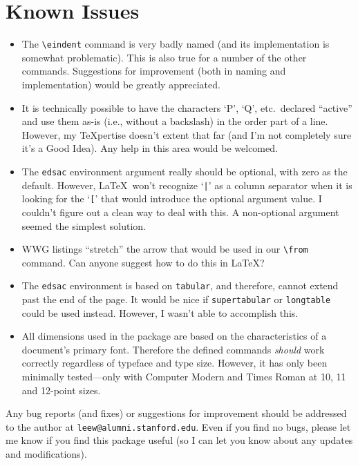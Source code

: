 \documentclass[11pt]{article}
\begin{document}
\section*{Known Issues}
\begin{itemize}
    \item
    The \verb"\eindent" command is very badly named (and its implementation is
    somewhat problematic).  This is also true for a number of the
    other commands.  Suggestions for improvement (both in naming and
    implementation) would be greatly appreciated.
    \item
    It is technically possible to have the characters `P', `Q', etc.\
    declared ``active'' and use them as-is (i.e., without a backslash)
    in the order part of a line.  However, my \TeX{pertise} doesn't
    extent that far (and I'm not completely sure it's a Good Idea).
    Any help in this area would be welcomed.
    \item
    The \texttt{edsac} environment argument really should be
    optional, with zero as the default.  However, \LaTeX\ won't
    recognize `\verb"|"' as a column separator when it is looking for
    the `\verb"["' that would introduce the optional argument value.
    I couldn't figure
    out a clean way to deal with this.  A non-optional argument seemed
    the simplest solution.
    \item
    WWG listings ``stretch'' the arrow that would be used in our
    \verb"\from" command.  Can anyone suggest how to do this in
    \LaTeX?
    \item
    The \texttt{edsac} environment is based on \texttt{tabular}, and
    therefore, cannot extend past the end of the page.  It would be
    nice if \texttt{supertabular} or \texttt{longtable} could be used
    instead.  However,  I wasn't able to accomplish this.
    \item
    All dimensions used in the package are based on the
    characteristics of a document's primary font. Therefore the
    defined commands \emph{should} work correctly regardless of
    typeface and type size.  However, it has only been minimally
    tested---only with Computer Modern and Times Roman at 10, 11 and
    12-point sizes.
\end{itemize}

Any bug reports (and fixes) or suggestions for improvement
should be addressed to the author at \texttt{leew@alumni.stanford.edu}.
Even if you find no bugs, please let me know if you find this package
useful (so I can let you know about any updates and modifications).
\end{document}
